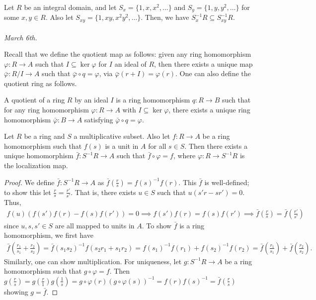 Let $R$ be an integral domain, and let $S_{x} = \{1,x,x^{2},\ldots\}$ and $S_{y} = \{1,y,y^{2},\ldots\}$ for some $x,y \in R$. Also let $S_{xy} = \{1,xy,x^{2}y^{2},\ldots\}$. Then, we have $S_{x}^{-1}R \subseteq S_{xy}^{-1}R$.
\\ \\
\noindent \textit{March 6th.}

Recall that we define the quotient map as follows: given any ring homomorphism $\varphi : R \to A$ such that $I \subseteq \ker \varphi$ for $I$ an ideal of $R$, then there exists a unique map $\bar{\varphi}:R/I \to A$ such that $\bar{\varphi} \circ q = \varphi$, via $\bar{\varphi}(r + I) = \varphi(r)$. One can also define the quotient ring as follows.

\begin{definition}
    A quotient of a ring $R$ by an ideal $I$ is a ring homomorphism $q : R \to B$ such that for any ring homomorphism $\varphi : R \to A$ with $I \subseteq \ker \varphi$, there exists a unique ring homomorphism $\bar{\varphi} : B \to A$ satisfying $\bar{\varphi} \circ q = \varphi$.
\end{definition}

\begin{theorem}
    Let $R$ be a ring and $S$ a multiplicative subset. Also let $f : R \to A$ be a ring homomorphism such that $f(s)$ is a unit in $A$ for all $s \in S$. Then there exists a unique homomorphism $\bar{f} : S^{-1}R \to A$ such that $\bar{f} \circ \varphi = f$, where $\varphi : R \to S^{-1}R$ is the localization map.
\end{theorem}

\begin{proof}
    We define $\bar{f} : S^{-1}R \to A$ as $\bar{f} ( \frac{r}{s}) = f(s)^{-1} f(r)$. This $\bar{f}$ is well-defined; to show this let $\frac{r}{s} = \frac{r'}{s'}$. That is, there exists $u \in S$ such that $u(s'r - sr') = 0$. Thus,
    \begin{align}
        f(u) (f(s')f(r) - f(s)f(r')) = 0 \implies f(s') f(r) = f(s) f(r') \implies \bar{f}(\frac{r}{s}) = \bar{f}(\frac{r'}{s'})
    \end{align}
    since $u,s,s' \in S$ are all mapped to units in $A$. To show $\bar{f}$ is a ring homomorphism, we first have
    \begin{align}
        \bar{f}(\frac{r_{1}}{s_{1}} + \frac{r_{2}}{s_{2}}) = \bar{f}(s_{1}s_{2})^{-1} f(s_{2}r_{1} + s_{1}r_{2}) = f(s_{1})^{-1} f(r_{1}) + f(s_{2})^{-1} f(r_{2}) = \bar{f}(\frac{r_{1}}{s_{1}}) + \bar{f}(\frac{r_{2}}{s_{2}}).
    \end{align}
    Similarly, one can show multiplication. For uniqueness, let $g : S^{-1}R \to A$ be a ring homomorphism such that $g \circ \varphi = f$. Then $g(\frac{r}{s}) = g(\frac{r}{1}) g(\frac{1}{s}) = g \circ \varphi(r) (g \circ \varphi(s))^{-1} = f(r) f(s)^{-1} = \bar{f}(\frac{r}{s})$ showing $g = \bar{f}$.
\end{proof}

